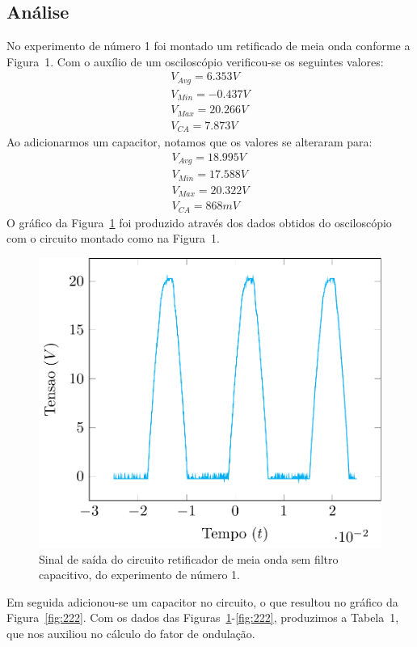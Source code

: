 \documentclass[12pt,a4paper]{article}
\begin{document}
\subsection{Análise}
No experimento de número 1 foi montado um retificado de meia onda conforme a Figura~1. Com o auxílio de um osciloscópio verificou-se os seguintes valores:
\begin{align*}
  V_{Avg} =6.353 V\\
  V_{Min} = -0.437 V \\
  V_{Max}= 20.266 V\\
  V_{CA} = 7.873 V
\end{align*}
Ao adicionarmos um capacitor, notamos que os valores se alteraram para:
\begin{align*}
  V_{Avg} =18.995 V\\
  V_{Min} = 17.588 V \\
  V_{Max}= 20.322 V\\
  V_{CA} = 868 mV
\end{align*}
O gráfico da Figura~\ref{fig:221} foi produzido através dos dados obtidos do osciloscópio com o circuito montado como na Figura~1.
\begin{figure}[htpb]
  \centering
  \includegraphics[width=0.8\linewidth]{221.pdf}
  \caption{Sinal de saída do circuito retificador de meia onda sem filtro capacitivo, do experimento de número 1.}
  \label{fig:221}
\end{figure}
Em seguida adicionou-se um capacitor no circuito, o que resultou no gráfico da Figura~\ref{fig:222}. Com os dados das Figuras~\ref{fig:221}-\ref{fig:222}, produzimos a Tabela~1, que nos auxiliou no cálculo do fator de ondulação.
\end{document}

